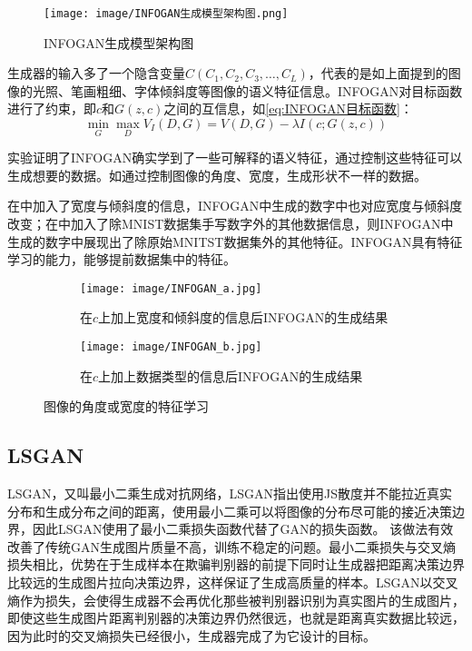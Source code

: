 \documentclass[lang=cn,a4paper,12pt,bibend=biber]{GAN}
\begin{document}
\begin{figure}[!htbp]
  \centering
  \texttt{[image: image/INFOGAN生成模型架构图.png]}
  \caption[]{INFOGAN生成模型架构图}
  \label{fig:INFOGAN生成模型架构图}
\end{figure}

生成器的输入多了一个隐含变量$C\left(C_{1}, C_{2}, C_{3}, \ldots, C_{L}\right)$，代表的是如上面提到的图像的光照、笔画粗细、字体倾斜度等图像的语义特征信息。INFOGAN对目标函数进行了约束，即$c$和$G(z,c)$之间的互信息，如\eqref{eq:INFOGAN目标函数}：
\begin{equation}
  \min _{G} \max _{D} V_{I}(D, G)=V(D, G)-\lambda I(c ; G(z, c))
  \label{eq:INFOGAN目标函数}
\end{equation}

实验\cite[]{NIPS2016_7c9d0b1f}证明了INFOGAN确实学到了一些可解释的语义特征，通过控制这些特征可以生成想要的数据。如通过控制图像的角度、宽度，生成形状不一样的数据。

在中加入了宽度与倾斜度的信息，INFOGAN中生成的数字中也对应宽度与倾斜度改变；在中加入了除MNIST数据集手写数字外的其他数据信息，则INFOGAN中生成的数字中展现出了除原始MNITST数据集外的其他特征。INFOGAN具有特征学习的能力，能够提前数据集中的特征。

\begin{figure}[hbtp]
  \centering
  \begin{subfigure}[]{0.38\textwidth}
    \centering
    \texttt{[image: image/INFOGAN\_a.jpg]}
    \caption{在$c$上加上宽度和倾斜度的信息后INFOGAN的生成结果}
    \label{fig:INFOGAN_a}
  \end{subfigure}
  \quad
  \begin{subfigure}[]{0.38\textwidth}
    \centering
    \texttt{[image: image/INFOGAN\_b.jpg]}
    \caption{在$c$上加上数据类型的信息后INFOGAN的生成结果}
    \label{fig:INFOGAN_b}
  \end{subfigure}
  \caption{图像的角度或宽度的特征学习}
  \label{fig:INFOGAN}
\end{figure}

\subsection{LSGAN}

LSGAN，又叫最小二乘生成对抗网络，LSGAN指出使用JS散度并不能拉近真实分布和生成分布之间的距离，使用最小二乘可以将图像的分布尽可能的接近决策边界，因此LSGAN使用了最小二乘损失函数代替了GAN的损失函数。
该做法有效改善了传统GAN生成图片质量不高，训练不稳定的问题。最小二乘损失与交叉熵损失相比，优势在于生成样本在欺骗判别器的前提下同时让生成器把距离决策边界比较远的生成图片拉向决策边界，这样保证了生成高质量的样本。LSGAN以交叉熵作为损失，会使得生成器不会再优化那些被判别器识别为真实图片的生成图片，即使这些生成图片距离判别器的决策边界仍然很远，也就是距离真实数据比较远，因为此时的交叉熵损失已经很小，生成器完成了为它设计的目标。
\end{document}
